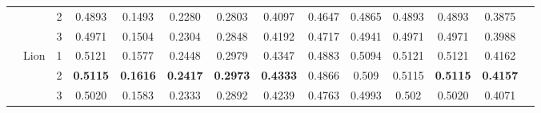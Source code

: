 \begin{table}[t]
{\begin{tabular}{lllccccccccccc}
 & & 2 & 0.4893 & 0.1493 & 0.2280 & 0.2803 & 0.4097 & 0.4647 & 0.4865 & 0.4893 & 0.4893 & 0.3875 \\
 & & 3 & 0.4971 & 0.1504 & 0.2304 & 0.2848 & 0.4192 & 0.4717 & 0.4941 & 0.4971 & 0.4971 & 0.3988 \\
\cmidrule{2-13}
 & \multirow{3}{*}{Lion} 
 & 1 & 0.5121 & 0.1577 & 0.2448 & 0.2979 & 0.4347 & 0.4883 & 0.5094 & 0.5121 & 0.5121 & 0.4162 \\
 & & 2 & \textbf{0.5115} & \textbf{0.1616} & \textbf{0.2417} & \textbf{0.2973} & \textbf{0.4333} & 0.4866 & 0.509 & 0.5115 & \textbf{0.5115} & \textbf{0.4157} \\
 & & 3 & 0.5020 & 0.1583 & 0.2333 & 0.2892 & 0.4239 & 0.4763 & 0.4993 & 0.502 & 0.5020 & 0.4071 \\
\bottomrule
\end{tabular}
}
\end{table}


